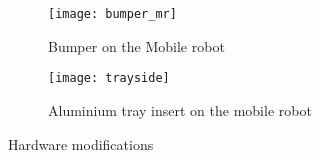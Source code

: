   	\begin{figure}[H]
    \centering
        \begin{subfigure}{0.48\textwidth}
			\texttt{[image: bumper\_mr]}
			\caption{Bumper on the Mobile robot}
			\label{fig:bumper}
        \end{subfigure}
        \hspace{10pt}
        \begin{subfigure}{0.48\textwidth}
			\texttt{[image: trayside]}
			\caption{Aluminium tray insert on the mobile robot}
			\label{fig:tray}
   		\end{subfigure}
    \caption{Hardware modifications}
    \end{figure}

